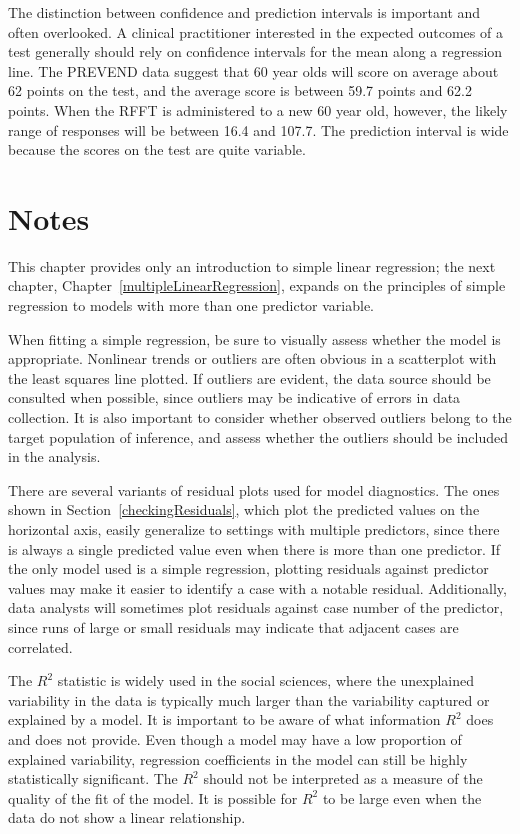 The distinction between confidence and prediction intervals is important and often overlooked.  A clinical practitioner interested in the expected outcomes of a test generally should rely on confidence intervals for the mean along a regression line.  The PREVEND data suggest that 60 year olds will score on average about 62 points on the test, and the average score is between 59.7 points and 62.2 points.  When the RFFT is administered to a new 60 year old, however, the likely range of responses will be between 16.4 and 107.7.  The prediction interval is wide because the scores on the test are quite variable.  


\section{Notes}
\label{chSimpleLinearRegNotes}

This chapter provides only an introduction to simple linear regression; the next chapter, Chapter~\ref{multipleLinearRegression}, expands on the principles of simple regression to models with more than one predictor variable. 

When fitting a simple regression, be sure to visually assess whether the model is appropriate. Nonlinear trends or outliers are often obvious in a scatterplot with the least squares line plotted. If outliers are evident, the data source should be consulted when possible, since outliers may be indicative of errors in data collection. It is also important to consider whether observed outliers belong to the target population of inference, and assess whether the outliers should be included in the analysis.

There are several variants of residual plots used for model diagnostics. The ones shown in Section~\ref{checkingResiduals}, which plot the predicted values on the horizontal axis, easily generalize to settings with multiple predictors, since there is always a single predicted value even when there is more than one predictor. If the only model used is a simple regression, plotting residuals against predictor values may make it easier to identify a case with a notable residual. Additionally, data analysts will sometimes plot residuals against case number of the predictor, since runs of large or small residuals may indicate that adjacent cases are correlated.

The $R^2$ statistic is widely used in the social sciences, where the unexplained variability in the data is typically much larger than the variability captured or explained by a model. It is important to be aware of what information $R^2$ does and does not provide. Even though a model may have a low proportion of explained variability, regression coefficients in the model can still be highly statistically significant. The $R^2$ should not be interpreted as a measure of the quality of the fit of the model. It is possible for $R^2$ to be large even when the data do not show a linear relationship. 

